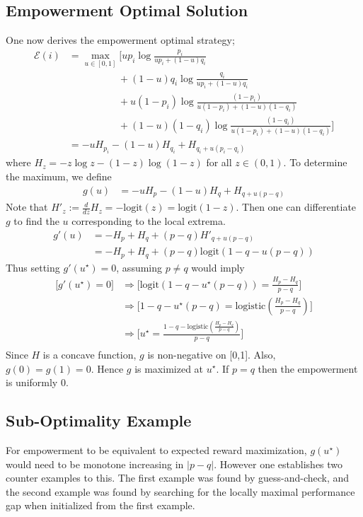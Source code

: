 \documentclass{article}
\newcommand{\Ee}{\mathcal{E}}
\begin{document}
\subsection{Empowerment Optimal Solution}
One now derives the empowerment optimal strategy; 
\begin{align*}
\Ee(i) 
	&= \max_{u\in [0,1]}\bigg[up_i \log \frac{p_i}{up_i+(1-u)q_i}\\
	&\hspace{5em} + (1-u)q_i \log \frac{q_i}{up_i+(1-u)q_i}\\
	&\hspace{5em} + u(1-p_i) \log \frac{(1-p_i)}{u(1-p_i)+(1-u)(1-q_i)}\\
	&\hspace{5em} + (1-u)(1-q_i) \log \frac{(1-q_i)}{u(1-p_i)+(1-u)(1-q_i)}\bigg]\\
	&=-uH_{p_i}-(1-u)H_{q_i}+H_{q_i+u(p_i-q_i)}
\end{align*}
where $H_z=-z\log z - (1-z)\log(1-z)$ for all $z\in (0,1)$. To determine the maximum, we define 
\begin{align*}
g(u)&= -uH_{p}-(1-u)H_{q}+H_{q+u(p-q)} 
\end{align*}
Note that $H'_z:=\frac{d}{dz} H_z= -\text{logit}(z)=\text{logit}(1-z)$.
Then one can differentiate $g$ to find the $u$ corresponding to the local extrema.
\begin{align*}
g'(u) 
	&= -H_p + H_q + (p-q)H'_{q+u(p-q)}\\
	&= -H_p + H_q +(p-q)\text{logit}(1-q-u(p-q))
\end{align*}
Thus setting $g'(u^\star)=0$, assuming $p\neq q$ would imply
\begin{align*}
\bigg[g'(u^\star)=0\bigg]
	&\Rightarrow\bigg[\text{logit}(1-q-u^\star(p-q)) = \frac{H_{p}-H_{q}}{p-q}\bigg]\\
	&\Rightarrow\bigg[1-q-u^\star(p-q) = \text{logistic}\left(\frac{H_{p}-H_{q}}{p-q}\right)\bigg]\\
	&\Rightarrow\bigg[u^\star=\frac{1-q-\text{logistic}\left(\frac{H_{p}-H_{q}}{p-q}\right)}{p-q} \bigg]\\
\end{align*}
Since $H$ is a concave function, $g$ is non-negative on [0,1]. Also, $g(0)=g(1)=0$. Hence $g$ is maximized at $u^\star$. If $p=q$ then the empowerment is uniformly $0$.

\subsection{Sub-Optimality Example}
For empowerment to be equivalent to expected reward maximization, $g(u^\star)$ would need to be monotone increasing in $|p-q|$. However one establishes two counter examples to this. The first example was found by guess-and-check, and the second example was found by searching for the locally maximal performance gap when initialized from the first example. 
\end{document}
